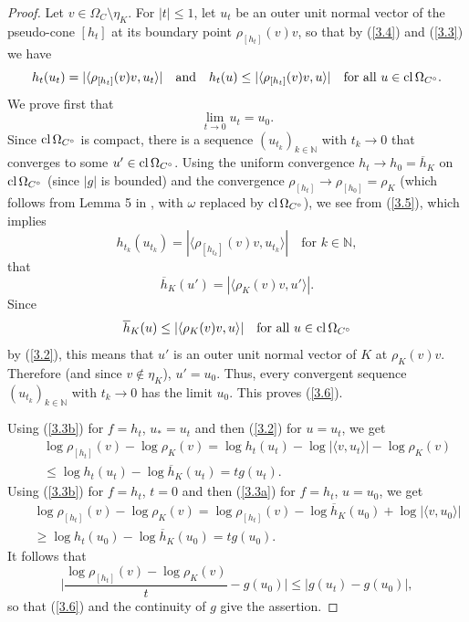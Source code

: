\documentclass[12pt]{article}
\newcommand{\0}{\mbox{\boldmath$o$}}
\newcommand{\N}{{\mathbb N}}
\begin{document}
\begin{proof}
Let $v\in \Omega_C\setminus \eta_K$. For $|t|\le 1$, let $u_t$ be an outer unit normal vector of the pseudo-cone $[h_t]$ at its boundary point $\rho_{[h_t]}(v)v$, so that by (\ref{3.4}) and (\ref{3.3}) we have
\begin{equation}\label{3.5}
h_t(u_t) = |\langle \rho_{[h_t]}(v)v,u_t\rangle| \quad\mbox{and}\quad h_t(u) \le |\langle \rho_{[h_t]}(v)v,u\rangle|\quad\mbox{for all }u\in{\rm cl}\,\Omega_{C^\circ}.
\end{equation}
We prove first that
\begin{equation}\label{3.6}
\lim_{t\to 0} u_t=u_0.
\end{equation}
Since ${\rm cl}\,\Omega_{C^\circ}$ is compact, there is a sequence $(u_{t_k})_{k\in\N}$ with $t_k\to 0$ that converges to some $u'\in{\rm cl}\,\Omega_{C^\circ}$. Using the uniform convergence $h_t\to h_0=\overline h_K$ on ${\rm cl}\,\Omega_{C^\circ}$ (since $|g|$ is bounded) and the convergence $\rho_{[h_t]}\to\rho_{[h_0]}= \rho_K$ (which follows from Lemma 5 in \cite{Sch18}, with $\omega$ replaced by ${\rm cl}\,\Omega_{C^\circ}$), we see from (\ref{3.5}), which implies
$$ h_{t_k}(u_{t_k}) = |\langle \rho_{[h_{t_k}]}(v)v,u_{t_k}\rangle|\quad\mbox{for }k\in\N,$$
that
$$ \overline h_K(u') =|\langle\rho_K(v)v,u'\rangle|.$$
Since
$$ \overline h_K(u) \le |\langle \rho_K(v)v,u\rangle|\quad \mbox{for all } u\in{\rm cl}\,\Omega_{C^\circ}$$
by (\ref{3.2}), this means that $u'$ is an outer unit normal vector of $K$ at $\rho_K(v)v$. Therefore (and since $v\notin\eta_K$), $u'= u_0$. Thus, every convergent sequence $(u_{t_k})_{k\in\N}$ with $t_k\to 0$ has the limit $u_0$. This proves (\ref{3.6}).

Using (\ref{3.3b}) for $f=h_t$, $u_*=u_t$ and then (\ref{3.2}) for $u=u_t$, we get
\begin{eqnarray*}
&& \log \rho_{[h_t]}(v)-\log \rho_K(v) =\log h_t(u_t) -\log|\langle v,u_t\rangle|-\log \rho_K(v)\\
&&\le \log h_t(u_t)-\log\overline h_K(u_t)= tg(u_t).
\end{eqnarray*}
Using (\ref{3.3b}) for $f=h_t$, $t=0$ and then (\ref{3.3a}) for $f=h_t$, $u=u_0$, we get
\begin{eqnarray*}
&& \log \rho_{[h_t]}(v)-\log \rho_K(v)= \log \rho_{[h_t]}(v)-\log\overline h_K(u_0) +\log|\langle v,u_0\rangle|\\
&&\ge \log h_t(u_0) -\log \overline h_K(u_0)= tg(u_0).
\end{eqnarray*}
It follows that
\begin{equation}\label{3.7}
\Bigg|\frac{\log \rho_{[h_t]}(v)-\log \rho_K(v)}{t}-g(u_0)\Bigg|\le|g(u_t)-g(u_0)|,
\end{equation}
so that (\ref{3.6}) and the continuity of $g$ give the assertion.
\end{proof}
\end{document}
